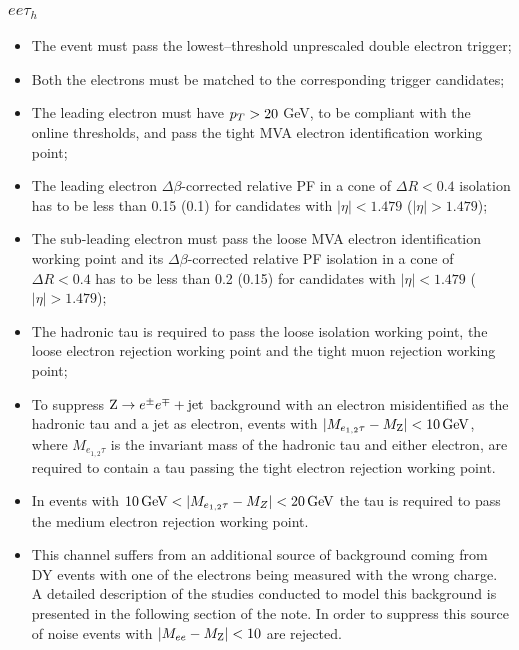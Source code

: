 \subsubsection{$ee\tau_h$}
\begin{itemize}
\item The event must pass the lowest--threshold unprescaled double electron trigger; 
\item Both the electrons must be matched to the corresponding trigger candidates;
\item The leading electron must have $p_{T} > 20$ GeV, to be compliant with the online thresholds, and pass the tight MVA electron identification working point;
\item The leading electron $\Delta \beta$-corrected relative PF in a cone of $\Delta R < 0.4$ isolation has to be less than 0.15 (0.1) for candidates with $|\eta| < 1.479$ ($|\eta| > 1.479$);
\item The sub-leading electron must pass the loose MVA electron identification working point and its $\Delta \beta$-corrected relative PF isolation in a cone of $\Delta R < 0.4$ has to be less than 0.2 (0.15) for candidates with $|\eta| < 1.479$ ($|\eta| > 1.479$);
\item The hadronic tau is required to pass the loose isolation working point, the loose electron rejection working point and the tight muon rejection working point;
\item To suppress $\mathrm{Z}\rightarrow e^\pm e^\mp+\mathrm{jet}$ background with an electron misidentified as the hadronic tau and a jet as electron, events with $|M_{e_{1,2}\tau} - M_{\mathrm{Z}}| < 10\, \mathrm{GeV}$, where $M_{e_{1,2}\tau}$ is the invariant mass of the hadronic tau and either electron, are required to contain a tau passing the tight electron rejection working point.                                                                         
\item In events with $10\, \mathrm{GeV} < |M_{e_{1,2}\tau} - M_Z| < 20\, \mathrm{GeV}$ the tau is required to pass the medium electron rejection working point.                                                               
\item This channel suffers from an additional source of background coming from DY events with one of the electrons being measured with the wrong charge. A detailed                                      
description of the studies conducted to model this background is presented in the following section of the note. In order to suppress this source of noise events with $|M_{ee} - M_{\mathrm{Z}}| < 10$ are rejected.                                                                                                                                                                 
\end{itemize}

